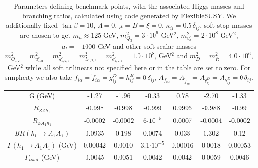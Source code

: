 \documentclass[12pt,a4paper]{article}
\begin{document}
\begin{table}
\begin{tabular}{| c || c | c |c| c| c| c |}
\hline
G (GeV)                        &       -1.27               & 	-1.96        & 	-0.33              & 0.78            & 	-2.70            & 	-1.33  \\
$R_{ZZh_1}$                      &     -0.998             &       -0.998       &  -0.999             & 0.9996          & -0.988            & 	-0.99  \\
$R_{ZA_1h_1}$                       &  -0.0002            &      -0.0002        &  6$\cdot 10^{-5}$              & 0.0007          & -0.0004           & 	-0.0002 \\
$BR(h_1\rightarrow A_1A_1)$       &    0.0935            &       0.198        &  0.0074             & 0.038           &  0.302            & 	0.12    \\
$\Gamma(h_1\rightarrow A_1A_1)$ (GeV) &	0.00042           & 	0.0010       & 	3.1$\cdot 10^{-5}$           & 0.00016         & 0.0018             & 	0.00053 \\
$\Gamma_{total}$ (GeV)           &     0.0045         	&   	0.0051 	     & 	0.0042              & 0.0042         & 0.0059              & 	0.0046  \\
\hline
\end{tabular}
\caption{Parameters defining benchmark points, with the associated Higgs masses and branching ratios, calculated using code generated by FlexibleSUSY. We additionally fixed $\tan\beta = 10$, $\Lambda = 0$, $\mu = B = \xi = 0$, $\kappa_{ij} = 0.5 \, \delta_{ij}$,   soft stop masses are chosen to get $m_h \approx 125$ GeV,  $m_{Q_{3}}^2 = 3\cdot 10^6$ GeV$^2$,  $m_{u^c_{3}}^2 = 2\cdot 10^8$ GeV$^2$, $a_t = -1000$  GeV and other soft scalar masses  $m_{Q_{1,2}}^2 = m_{u^c_{1,2}}^2 = m_{d^c_{1,2,3}}^2 = m_{L_{1,2, 3}}^2 = m_{e^c_{1,2,3}}^2 = 1.0 \cdot 10^8$, GeV$^2$ and  $m_{D}^2 =  m_{\overline{D}}^2 = 4.0 \cdot 10^6$,  GeV$^2$ while all soft trilinears not specified here or in the table are set to zero. For simplicity we also take $f_{i\alpha} = \tilde{f}_{i\alpha} = g^D_{ij} = h^E_{ij} =0 \, \delta_{ij}$,  $A_{f_{i\alpha}} = A_{\tilde{f}_{i\alpha}} = A_{g^D_{ij}} = A_{h^E_{ij}} =0 \, \delta_{ij}$.}
\end{table}
\end{document}
